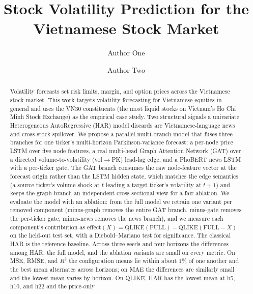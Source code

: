 \documentclass[runningheads]{llncs}
\begin{document}
%
\title{Stock Volatility Prediction for the Vietnamese Stock Market}
%
%
\author{Author One \and Author Two}
%
%
\maketitle
%
\begin{abstract}
Volatility forecasts set risk limits, margin, and option prices across the Vietnamese stock market. This
work targets volatility forecasting for Vietnamese equities in general and uses the VN30 constituents
(the most liquid stocks on Vietnam's Ho Chi Minh Stock Exchange) as the empirical case study. Two
structural signals a univariate Heterogeneous AutoRegressive (HAR) model discards are Vietnamese-language
news and cross-stock spillover. We propose a parallel multi-branch model that fuses three branches for one
ticker's multi-horizon Parkinson-variance forecast: a per-node price LSTM over five node features, a real
multi-head Graph Attention Network (GAT) over a directed volume-to-volatility (vol$\to$PK) lead-lag edge,
and a PhoBERT news LSTM with a per-ticker gate. The GAT branch consumes the raw node-feature vector at the
forecast origin rather than the LSTM hidden state, which matches the edge semantics (a source ticker's
volume shock at $t$ leading a target ticker's volatility at $t{+}1$) and keeps the graph branch an
independent cross-sectional view for a fair ablation. We evaluate the model with an ablation: from the full
model we retrain one variant per removed component (minus-graph removes the entire GAT branch, minus-gate
removes the per-ticker gate, minus-news removes the news branch), and we measure each component's
contribution as $\text{effect}(X)=\text{QLIKE}(\text{FULL})-\text{QLIKE}(\text{FULL}{-}X)$ on the held-out
test set, with a Diebold--Mariano test for significance. The classical HAR is the reference baseline.
Across three seeds and four horizons the differences among HAR, the full model, and the ablation variants
are small on every metric. On MSE, RMSE, and $R^2$ the configuration means lie within about 1\% of one
another and the best mean alternates across horizons; on MAE the differences are similarly small and the
lowest mean varies by horizon. On QLIKE, HAR has the lowest mean at h5, h10, and h22 and the price-only

\end{abstract}
\end{document}
